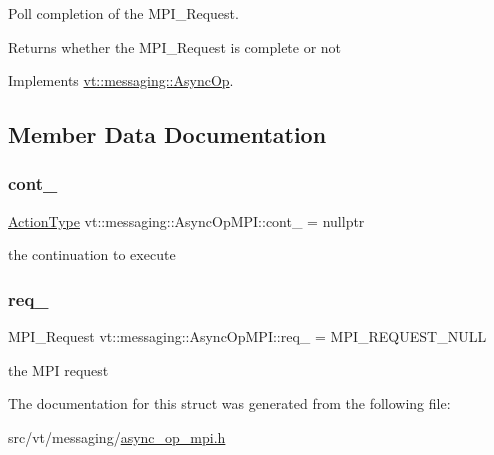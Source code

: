 Poll completion of the {\ttfamily M\+P\+I\+\_\+\+Request}. 

\begin{DoxyReturn}{Returns}
whether the {\ttfamily M\+P\+I\+\_\+\+Request} is complete or not 
\end{DoxyReturn}


Implements \hyperlink{structvt_1_1messaging_1_1_async_op_a87259770152a18e1ff8127020c6b0e41}{vt\+::messaging\+::\+Async\+Op}.



\subsection{Member Data Documentation}
\mbox{\label{structvt_1_1messaging_1_1_async_op_m_p_i_ac3017bb9d51398e04fdbcf2286956a26}} 
\subsubsection{\texorpdfstring{cont\+\_\+}{cont\_}}
{\footnotesize\ttfamily \hyperlink{namespacevt_ae0a5a7b18cc99d7b732cb4d44f46b0f3}{Action\+Type} vt\+::messaging\+::\+Async\+Op\+M\+P\+I\+::cont\+\_\+ = nullptr\hspace{0.3cm}{\ttfamily [private]}}

the continuation to execute \mbox{\label{structvt_1_1messaging_1_1_async_op_m_p_i_a80403a1d49de934acf1e8b2e3dd6484c}} 
\subsubsection{\texorpdfstring{req\+\_\+}{req\_}}
{\footnotesize\ttfamily M\+P\+I\+\_\+\+Request vt\+::messaging\+::\+Async\+Op\+M\+P\+I\+::req\+\_\+ = M\+P\+I\+\_\+\+R\+E\+Q\+U\+E\+S\+T\+\_\+\+N\+U\+LL\hspace{0.3cm}{\ttfamily [private]}}

the M\+PI request 

The documentation for this struct was generated from the following file\+:\begin{DoxyCompactItemize}
\item 
src/vt/messaging/\hyperlink{async__op__mpi_8h}{async\+\_\+op\+\_\+mpi.\+h}\end{DoxyCompactItemize}
